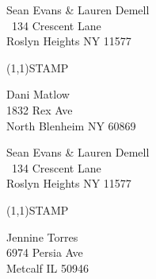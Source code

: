 \documentclass[12pt]{article}
\begin{document}
\clearpage

\begin{minipage}{.5\linewidth} \noindent
Sean Evans \& Lauren Demell\\\ 
134 Crescent Lane\\ 
Roslyn Heights NY 11577
\end{minipage}
\begin{minipage}{.5\linewidth \hspace{-.2in} \vspace{-.3in}}
\begin{flushright}
\framebox(1,1){STAMP}
\end{flushright}
\end{minipage}

\begin{center} \begin{Huge} \vspace*{\fill}
Dani Matlow\\
1832 Rex Ave\\
North Blenheim NY 60869\\
\vspace{\fill} \end{Huge} \end{center}

\clearpage

\begin{minipage}{.5\linewidth} \noindent
Sean Evans \& Lauren Demell\\\ 
134 Crescent Lane\\ 
Roslyn Heights NY 11577
\end{minipage}
\begin{minipage}{.5\linewidth \hspace{-.2in} \vspace{-.3in}}
\begin{flushright}
\framebox(1,1){STAMP}
\end{flushright}
\end{minipage}

\begin{center} \begin{Huge} \vspace*{\fill}
Jennine Torres\\
6974 Persia Ave\\
Metcalf IL 50946\\
\vspace{\fill} \end{Huge} \end{center}

\clearpage
\end{document}
